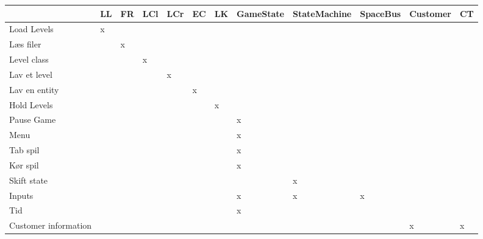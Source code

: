 \begin{table}[h!]
\hspace{-95pt}
\label{my-label}
\begin{tabular}{|l|l|l|l|l|l|l|l|l|l|l|l|}
\hline
               & LL & FR & LCl & LCr & EC & LK & GameState & StateMachine & SpaceBus &Customer & CT\\\hline

Load Levels   &          x           &            &       &      &              &       &       &       &      &&\\\hline
Læs filer    &         &              x          &       &      &              &       &       &       &       &&\\\hline
Level class        &         &             &             x    &      &              &      &       &          &     &&\\\hline
Lav et level  &         &             &            &       x&                   &       &       &       &       &&\\\hline
Lav en entity &         &             &            &       &     x &                      &       &       &     &&\\\hline
Hold Levels   &         &             &            &       &      &x            &            &       & &&\\\hline
Pause Game &         &             &            &       &      &                      &x       &       &     &&\\\hline
Menu &         &             &            &       &      &                      &x       &       &     &&\\\hline
Tab spil &         &             &            &       &      &                      &x       &       &     &&\\\hline
Kør spil &         &             &            &       &      &                      &x       &       &     &&\\\hline
Skift state &         &             &            &       &      &                      &       &x       &     &&\\\hline
Inputs &         &             &            &       &      &                      & x           & x   & x  &&\\\hline
Tid &         &             &            &       &      &                      & x           &    &   &&\\\hline
Customer information &         &             &            &       &      &                      &            &    &   &x&x\\\hline
\end{tabular}
\end{table}

